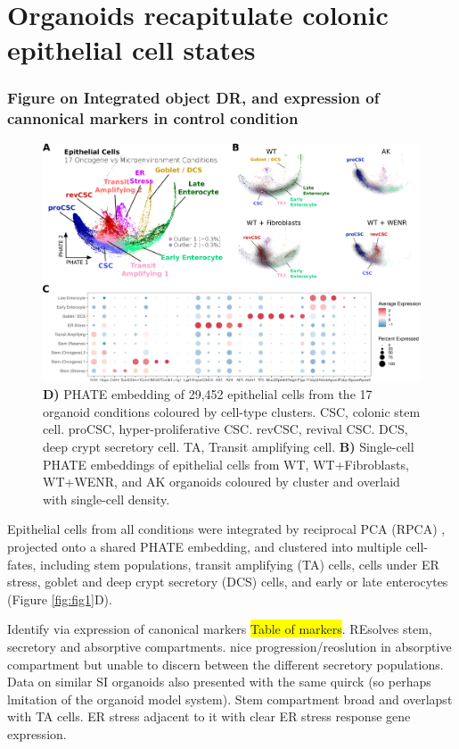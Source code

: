 \section{Organoids recapitulate colonic epithelial cell states}

\subsubsection{Figure on Integrated object DR, and expression of cannonical markers in control condition}
\begin{figure}
    \centering
    \includegraphics{04seq/figs/4SEQ_INTctrl.png}
    \caption{\textbf{D)} PHATE embedding of 29,452 epithelial cells from the 17 organoid conditions coloured by cell-type clusters. CSC, colonic stem cell. proCSC, hyper-proliferative CSC. revCSC, revival CSC. DCS, deep crypt secretory cell. TA, Transit amplifying cell. \textbf{B)} Single-cell PHATE embeddings of epithelial cells from WT, WT+Fibroblasts, WT+WENR, and AK organoids coloured by cluster and overlaid with single-cell density.}
    \label{fig:4intepi}
\end{figure}

Epithelial cells from all conditions were integrated by reciprocal PCA (RPCA) \cite{hao_integrated_2021}, projected onto a shared PHATE embedding, and clustered into multiple cell-fates, including stem populations, transit amplifying (TA) cells, cells under ER stress, goblet and deep crypt secretory (DCS) cells, and early or late enterocytes (Figure \ref{fig:fig1}D). 

Identify via expression of canonical markers \colorbox{yellow}{Table of markers}. REsolves stem, secretory and absorptive compartments. nice progression/reoslution in absorptive compartment but unable to discern between the different secretory populations. Data on similar SI organoids also presented with the same quirck (so perhaps lmitation of the organoid model system). Stem compartment broad and overlapst with TA cells. ER stress adjacent to it with clear ER stress response gene expression.

